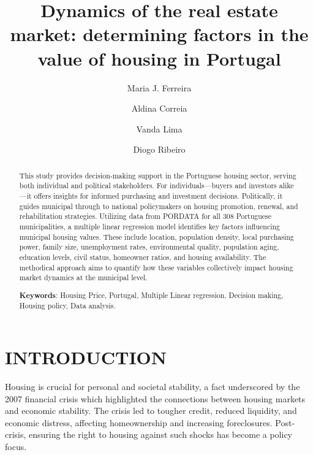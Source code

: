 \documentclass{aip-cp}
\begin{document}
\title{Dynamics of the real estate market: determining factors in the value of housing in Portugal}

\author[aff1]{Maria J. Ferreira}
\author[aff1]{Aldina Correia}

\author[aff1]{Vanda Lima}
\author[aff2]{Diogo Ribeiro}

\maketitle

\begin{abstract}
    This study provides decision-making support in the Portuguese housing sector, serving both individual and political stakeholders. For individuals—buyers and investors alike—it offers insights for informed purchasing and investment decisions. Politically, it guides municipal through to national policymakers on housing promotion, renewal, and rehabilitation strategies. Utilizing data from PORDATA for all 308 Portuguese municipalities, a multiple linear regression model identifies key factors influencing municipal housing values. These include location, population density, local purchasing power, family size, unemployment rates, environmental quality, population aging, education levels, civil status, homeowner ratios, and housing availability. The methodical approach aims to quantify how these variables collectively impact housing market dynamics at the municipal level.


\textbf{Keywords}: Housing Price, Portugal, Multiple Linear regression, Decision making, Housing policy, Data analysis.
\end{abstract}

\section{INTRODUCTION}
Housing is crucial for personal and societal stability, a fact underscored by the 2007 financial crisis which highlighted the connections between housing markets and economic stability. The crisis led to tougher credit, reduced liquidity, and economic distress, affecting homeownership and increasing foreclosures. Post-crisis, ensuring the right to housing against such shocks has become a policy focus.
\end{document}
